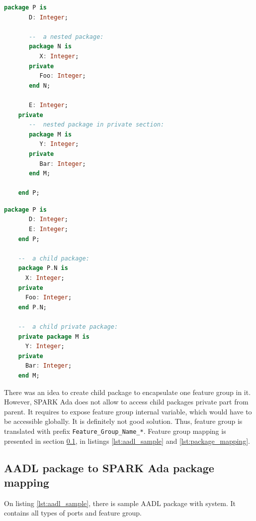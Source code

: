 \singlespacing
\begin{lstlisting}[language=ada, frame=single, gobble=0, caption={Nested packages in SPARK Ada}, label={lst:nested_packages}]
	package P is
	   D: Integer;

	   --  a nested package:
	   package N is
	      X: Integer;
	   private
	      Foo: Integer;
	   end N;

	   E: Integer;
	private
	   --  nested package in private section:
	   package M is
	      Y: Integer;
	   private
	      Bar: Integer;
	   end M;

	end P;
\end{lstlisting}
\doublespacing

\singlespacing
\begin{lstlisting}[language=ada, frame=single, gobble=0, caption={Child packages in SPARK Ada}, label={lst:child_packages}]
	package P is
	   D: Integer;
	   E: Integer;
	end P;

	--  a child package:
	package P.N is
      X: Integer;
   	private
      Foo: Integer;
	end P.N;

	--  a child private package:
	private package M is
	  Y: Integer;
	private
	  Bar: Integer;
	end M;
\end{lstlisting}
\doublespacing

There was an idea to create child package to encapsulate one feature group in it. However, SPARK Ada does not allow to access child packages private part from parent. It requires to expose feature group internal variable, which would have to be accessible globally. It is definitely not good solution. Thus, feature group is translated with prefix \lstinline{Feature_Group_Name_*}. Feature group mapping is presented in section \ref{codegen:mapping:packages}, in listings \ref{lst:aadl_sample} and \ref{lst:package_mapping}.


\subsection{AADL package to SPARK Ada package mapping}
\label{codegen:mapping:packages}

On listing \ref{lst:aadl_sample}, there is sample AADL package with system. It contains all types of ports and feature group.

